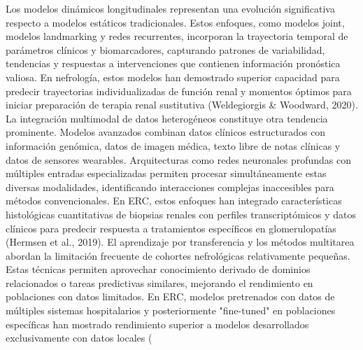 \documentclass{article}
\begin{document}
\begin{multicols}{2}
Los modelos dinámicos longitudinales representan una evolución significativa respecto a modelos estáticos tradicionales. Estos enfoques, como modelos joint, modelos landmarking y redes recurrentes, incorporan la trayectoria temporal de parámetros clínicos y biomarcadores, capturando patrones de variabilidad, tendencias y respuestas a intervenciones que contienen información pronóstica valiosa. En nefrología, estos modelos han demostrado superior capacidad para predecir trayectorias individualizadas de función renal y momentos óptimos para iniciar preparación de terapia renal sustitutiva (Weldegiorgis \& Woodward, 2020).
La integración multimodal de datos heterogéneos constituye otra tendencia prominente. Modelos avanzados combinan datos clínicos estructurados con información genómica, datos de imagen médica, texto libre de notas clínicas y datos de sensores wearables. Arquitecturas como redes neuronales profundas con múltiples entradas especializadas permiten procesar simultáneamente estas diversas modalidades, identificando interacciones complejas inaccesibles para métodos convencionales. En ERC, estos enfoques han integrado características histológicas cuantitativas de biopsias renales con perfiles transcriptómicos y datos clínicos para predecir respuesta a tratamientos específicos en glomerulopatías (Hermsen et al., 2019).
El aprendizaje por transferencia y los métodos multitarea abordan la limitación frecuente de cohortes nefrológicas relativamente pequeñas. Estas técnicas permiten aprovechar conocimiento derivado de dominios relacionados o tareas predictivas similares, mejorando el rendimiento en poblaciones con datos limitados. En ERC, modelos pretrenados con datos de múltiples sistemas hospitalarios y posteriormente "fine-tuned" en poblaciones específicas han mostrado rendimiento superior a modelos desarrollados exclusivamente con datos locales (
\end{multicols}
\restoregeometry
\end{document}
